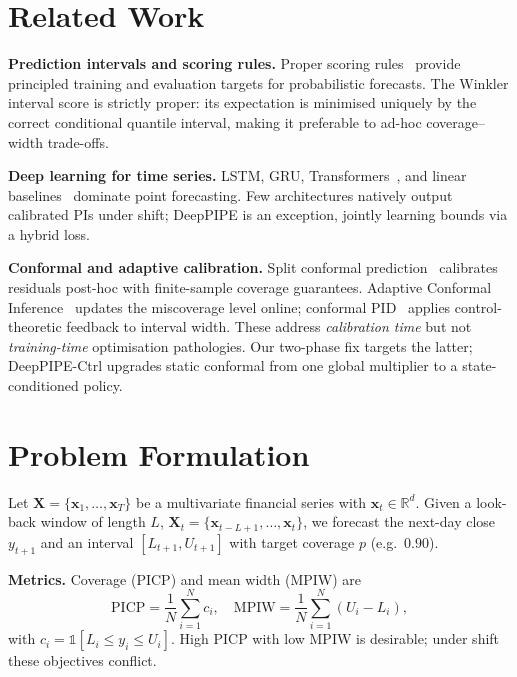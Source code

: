 \documentclass[conference]{IEEEtran}
\begin{document}
\section{Related Work}
\label{sec:related}
\textbf{Prediction intervals and scoring rules.}
Proper scoring rules~\cite{gneiting2007scoring} provide principled training and evaluation targets
for probabilistic forecasts. The Winkler interval score is strictly proper: its expectation is
minimised uniquely by the correct conditional quantile interval, making it preferable to ad-hoc
coverage--width trade-offs.

\textbf{Deep learning for time series.}
LSTM, GRU, Transformers~\cite{zhou2021informer,lim2021tft}, and linear
baselines~\cite{zeng2023dlinear} dominate point forecasting. Few architectures natively output
calibrated PIs under shift; DeepPIPE is an exception, jointly learning bounds via a hybrid loss.

\textbf{Conformal and adaptive calibration.}
Split conformal prediction~\cite{romano2019cqr} calibrates residuals post-hoc with finite-sample
coverage guarantees. Adaptive Conformal Inference~\cite{gibbs2021aci} updates the miscoverage
level online; conformal PID~\cite{angelopoulos2023pid} applies control-theoretic feedback to
interval width. These address \emph{calibration time} but not \emph{training-time} optimisation
pathologies. Our two-phase fix targets the latter; DeepPIPE-Ctrl upgrades static conformal from
one global multiplier to a state-conditioned policy.

\section{Problem Formulation}
\label{sec:problem}
Let $\mathbf{X}=\{\mathbf{x}_1,\ldots,\mathbf{x}_T\}$ be a multivariate financial series with
$\mathbf{x}_t\in\mathbb{R}^d$. Given a look-back window of length $L$,
$\mathbf{X}_t=\{\mathbf{x}_{t-L+1},\ldots,\mathbf{x}_t\}$, we forecast the next-day close
$y_{t+1}$ and an interval $[L_{t+1},U_{t+1}]$ with target coverage $p$ (e.g.\ $0.90$).

\textbf{Metrics.} Coverage (PICP) and mean width (MPIW) are
\begin{equation}
  \mathrm{PICP}=\frac{1}{N}\sum_{i=1}^{N}c_i,\quad
  \mathrm{MPIW}=\frac{1}{N}\sum_{i=1}^{N}(U_i-L_i),
\end{equation}
with $c_i=\mathbb{1}[L_i\le y_i\le U_i]$. High PICP with low MPIW is desirable; under shift these
objectives conflict.
\end{document}
